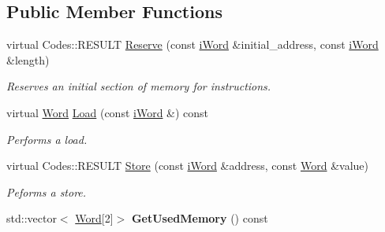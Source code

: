 \subsection*{Public Member Functions}
\begin{DoxyCompactItemize}
\item 
virtual Codes::RESULT \hyperlink{classMemory_a80cd994d4833dde66b8005184e510dda}{Reserve} (const \hyperlink{classiWord}{iWord} \&initial\_\-address, const \hyperlink{classiWord}{iWord} \&length)
\begin{DoxyCompactList}\small\item\em Reserves an initial section of memory for instructions. \item\end{DoxyCompactList}\item 
virtual \hyperlink{classWord}{Word} \hyperlink{classMemory_aca021609915080b38ca1b00d9b416e80}{Load} (const \hyperlink{classiWord}{iWord} \&) const 
\begin{DoxyCompactList}\small\item\em Performs a load. \item\end{DoxyCompactList}\item 
virtual Codes::RESULT \hyperlink{classMemory_a23703464fb24710d09be1b2010e79edc}{Store} (const \hyperlink{classiWord}{iWord} \&address, const \hyperlink{classWord}{Word} \&value)
\begin{DoxyCompactList}\small\item\em Peforms a store. \item\end{DoxyCompactList}\item 
\hypertarget{classMemory_a8a06a6f30a19b58795ab40f9f48dca4f}{
std::vector$<$ \hyperlink{classWord}{Word}\mbox{[}2\mbox{]}$>$ {\bfseries GetUsedMemory} () const }
\label{classMemory_a8a06a6f30a19b58795ab40f9f48dca4f}


\end{DoxyCompactItemize}

